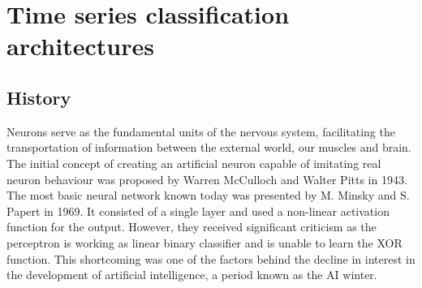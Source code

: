 \chapter{Time series classification architectures}
\section{History}
\label{sec:History}

Neurons serve as the fundamental units of the nervous system, facilitating the transportation of information between the external world, our muscles and brain. The initial concept of creating an artificial neuron capable of imitating real neuron behaviour was proposed by Warren McCulloch and Walter Pitts in 1943. The most basic neural network known today was presented by M. Minsky and S. Papert in 1969. It consisted of a single layer and used a non-linear activation function for the output. However, they received significant criticism as the perceptron is working as linear binary classifier and is unable to learn the XOR function. This shortcoming was one of the factors behind the decline in interest in the development of artificial intelligence, a period known as the AI winter. 

